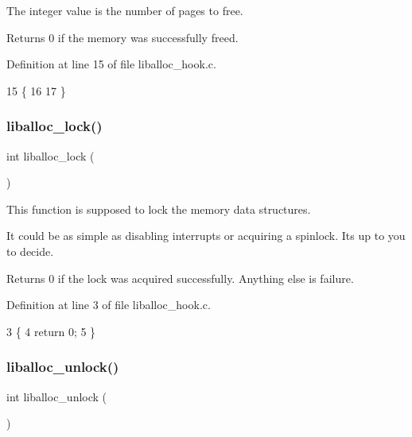 The integer value is the number of pages to free.

\begin{DoxyReturn}{Returns}
0 if the memory was successfully freed. 
\end{DoxyReturn}


Definition at line 15 of file liballoc\+\_\+hook.\+c.


\begin{DoxyCode}
15                                         \{
16 
17 \}
\end{DoxyCode}
\mbox{\label{a00041_a8b5670e4594b0b6f8be78fe17f0c3b53_a8b5670e4594b0b6f8be78fe17f0c3b53}} 
\subsubsection{\texorpdfstring{liballoc\+\_\+lock()}{liballoc\_lock()}}
{\footnotesize\ttfamily int liballoc\+\_\+lock (\begin{DoxyParamCaption}{ }\end{DoxyParamCaption})}



This function is supposed to lock the memory data structures. 

It could be as simple as disabling interrupts or acquiring a spinlock. It\textquotesingle{}s up to you to decide.

\begin{DoxyReturn}{Returns}
0 if the lock was acquired successfully. Anything else is failure. 
\end{DoxyReturn}


Definition at line 3 of file liballoc\+\_\+hook.\+c.


\begin{DoxyCode}
3                     \{
4     \textcolor{keywordflow}{return} 0;
5 \}
\end{DoxyCode}
\mbox{\label{a00041_aedc23f198b2882d41d0caa316453967b_aedc23f198b2882d41d0caa316453967b}} 
\subsubsection{\texorpdfstring{liballoc\+\_\+unlock()}{liballoc\_unlock()}}
{\footnotesize\ttfamily int liballoc\+\_\+unlock (\begin{DoxyParamCaption}{ }\end{DoxyParamCaption})}



